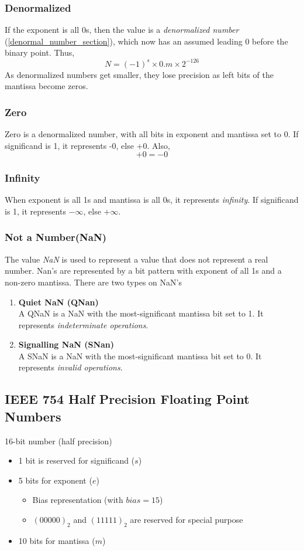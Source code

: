 \documentclass[oneside]{book}
\begin{document}
\subsubsection{Denormalized}
If the exponent is all 0s, then the value is a \textit{denormalized number} (\cref{denormal_number_section}), which now has an assumed leading 0 before the binary point. Thus,
\[
	N = (-1)^s \times 0.m \times 2^{-126}
\]
As denormalized numbers get smaller, they lose precision as left bits of the mantissa become zeros.

\subsubsection{Zero}
Zero is a denormalized number, with all bits in exponent and mantissa set to 0. If significand is 1, it represents -0, else +0. Also,
\[
	+0 = -0
\]

\subsubsection{Infinity}
When exponent is all 1s and mantissa is all 0s, it represents \textit{infinity}. If significand is 1, it represents \(-\infty\), else \(+\infty\).

\subsubsection{Not a Number(NaN)}
The value \textit{NaN} is used to represent a value that does not represent a real number. Nan's are represented by a bit pattern with exponent of all 1s and a non-zero mantissa. There are two types on NaN's
\begin{enumerate}
	\item \textbf{Quiet NaN (QNan)}\\
	      A QNaN is a NaN with the most-significant mantissa bit set to 1. It represents \textit{indeterminate operations}.
	\item \textbf{Signalling NaN (SNan)}\\
	      A SNaN is a NaN with the most-significant mantissa bit set to 0. It represents \textit{invalid operations}.

\end{enumerate}

\subsection{IEEE 754 Half Precision Floating Point Numbers}
16-bit number (half precision)
\begin{itemize}
	\item 1 bit is reserved for significand ($s$)
	\item 5 bits for exponent ($e$)
	      \begin{itemize}
		      \item Bias representation (with $bias=15$)
		      \item $(0 0000)_2$ and $(1 1111)_2$ are reserved for special purpose
	      \end{itemize}
	\item 10 bits for mantissa ($m$)
\end{itemize}
\end{document}
